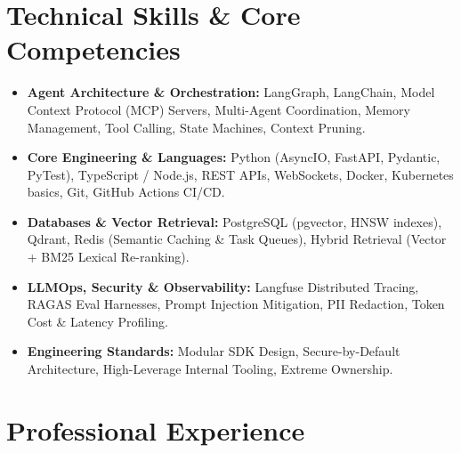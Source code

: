 \documentclass[a4paper,10pt]{article}
\begin{document}
\section{Technical Skills \& Core Competencies}
\begin{itemize}[leftmargin=1.2em, itemsep=2pt]
  \item \textbf{Agent Architecture \& Orchestration:} LangGraph, LangChain, Model Context Protocol (MCP) Servers, Multi-Agent Coordination, Memory Management, Tool Calling, State Machines, Context Pruning.
  \item \textbf{Core Engineering \& Languages:} Python (AsyncIO, FastAPI, Pydantic, PyTest), TypeScript / Node.js, REST APIs, WebSockets, Docker, Kubernetes basics, Git, GitHub Actions CI/CD.
  \item \textbf{Databases \& Vector Retrieval:} PostgreSQL (pgvector, HNSW indexes), Qdrant, Redis (Semantic Caching \& Task Queues), Hybrid Retrieval (Vector + BM25 Lexical Re-ranking).
  \item \textbf{LLMOps, Security \& Observability:} Langfuse Distributed Tracing, RAGAS Eval Harnesses, Prompt Injection Mitigation, PII Redaction, Token Cost \& Latency Profiling.
  \item \textbf{Engineering Standards:} Modular SDK Design, Secure-by-Default Architecture, High-Leverage Internal Tooling, Extreme Ownership.
\end{itemize}

\section{Professional Experience}
\end{document}
